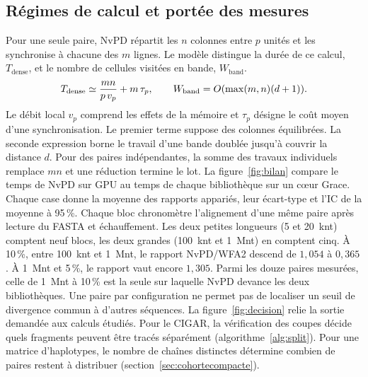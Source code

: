 \subsection{Régimes de calcul et portée des mesures}
Pour une seule paire, NvPD répartit les \(n\) colonnes entre \(p\) unités et les synchronise à chacune des \(m\) lignes. Le modèle distingue la durée de ce calcul, \(T_{\mathrm{dense}}\), et le nombre de cellules visitées en bande, \(W_{\mathrm{band}}\).
\[
 T_{\rm dense}\simeq \frac{mn}{p\,v_p}+m\,\tau_p,
 \qquad W_{\mathrm{band}}=O(\max(m,n)(d+1)).
\]
Le débit local \(v_p\) comprend les effets de la mémoire et \(\tau_p\) désigne le coût moyen d'une synchronisation. Le premier terme suppose des colonnes équilibrées. La seconde expression borne le travail d'une bande doublée jusqu'à couvrir la distance \(d\). Pour des paires indépendantes, la somme des travaux individuels remplace \(mn\) et une réduction termine le lot.
La figure~\ref{fig:bilan} compare le temps de NvPD sur GPU au temps de chaque bibliothèque sur un cœur Grace. Chaque case donne la moyenne des rapports appariés, leur écart-type et l’IC de la moyenne à 95\,\%. Chaque bloc chronomètre l’alignement d’une même paire après lecture du FASTA et échauffement. Les deux petites longueurs (5 et 20~knt) comptent neuf blocs, les deux grandes (100~knt et 1~Mnt) en comptent cinq.
\FloatBarrier
À 10\,\%, entre 100~knt et 1~Mnt, le rapport NvPD/WFA2 descend de \(1{,}054\) à \(0{,}365\). À 1~Mnt et 5\,\%, le rapport vaut encore \(1{,}305\). Parmi les douze paires mesurées, celle de 1~Mnt à 10\,\% est la seule sur laquelle NvPD devance les deux bibliothèques. Une paire par configuration ne permet pas de localiser un seuil de divergence commun à d’autres séquences.
La figure~\ref{fig:decision} relie la sortie demandée aux calculs étudiés. Pour le CIGAR, la vérification des coupes décide quels fragments peuvent être tracés séparément (algorithme~\ref{alg:split}). Pour une matrice d'haplotypes, le nombre de chaînes distinctes détermine combien de paires restent à distribuer (section~\ref{sec:cohortecompacte}).
\FloatBarrier
